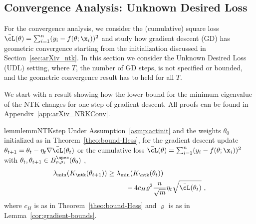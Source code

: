 \subsection{Convergence Analysis: Unknown Desired Loss} 

For the convergence analysis, we consider the (cumulative) square loss $\bar{\cL}(\theta) = \sum_{i=1}^n (y_i - f(\theta;\x_i))^2$ and study how gradient descent (GD) has geometric convergence starting from the initialization discussed in Section~\ref{sec:arXiv_ntk}. In this section we consider the Unknown Desired Loss (UDL) setting, where $T$, the number of GD steps, is not specified or bounded, and the geometric convergence result has to held for all $T$. 

We start with a result showing how the lower bound for the minimum eigenvalue of the NTK changes for one step of gradient descent. All proofs can be found in Appendix~\ref{app:arXiv_NRKConv}.

\begin{restatable}{lemm}{lemmNTKstep}
\label{lemm:NTK_step}
Under Assumption~\ref{asmp:actinit} and the weights $\theta_0$ initialized as in Theorem~\ref{theo:bound-Hess}, for the gradient descent update $\theta_{t+1} = \theta_t - \eta_t \nabla \bar{\cL}(\theta_t)$ or the cumulative loss $\bar{\cL}(\theta) = \sum_{i=1}^n (y_i - f(\theta;\x_i))^2$ with $\theta_t, \theta_{t+1} \in B_{\rho,\rho_1}^{\spec}(\theta_0)$ ,
\begin{equation}
\begin{split}
\lambda_{\min}(K_{\ntk}(\theta_{t+1})) &\geq \lambda_{\min}(K_{\ntk}(
\theta_t))\\ 
&~~~~~~~~  
- 4c_H \varrho^2  \frac{n}{\sqrt{m}} \eta_t \sqrt{\bar{\cL}(\theta_t)} ~,
\end{split}    
\end{equation}
where $c_H$ is as in Theorem~\ref{theo:bound-Hess} and $\varrho$ is as in Lemma~\ref{cor:gradient-bounds}. 
\end{restatable}


